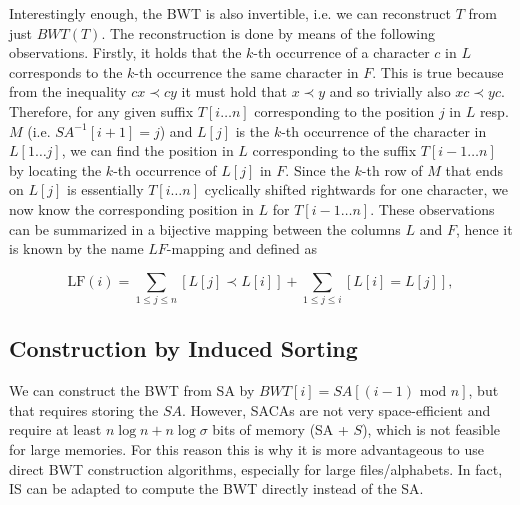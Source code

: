 Interestingly enough, the BWT is also invertible, i.e. we can reconstruct $T$ from just $BWT(T)$. The reconstruction is done by means of the following observations. Firstly, it holds that the $k$-th occurrence of a character $c$ in $L$ corresponds to the $k$-th occurrence the same character in $F$. This is true because from the inequality $cx \prec cy$ it must hold that $x \prec y$ and so trivially also $xc \prec yc$. Therefore, for any given suffix $T[i\ldots n]$ corresponding to the position $j$ in $L$ resp. $M$ (i.e. $SA^{-1}[i+1] = j$) and $L[j]$ is the $k$-th occurrence of the character in $L[1 \ldots j]$, we can find the position in $L$ corresponding to the suffix $T[i-1 \ldots n]$ by locating the $k$-th occurrence of $L[j]$ in $F$. Since the $k$-th row of $M$ that ends on $L[j]$ is essentially $T[i \ldots n]$ cyclically shifted rightwards for one character, we now know the corresponding position in $L$ for $T[i-1 \ldots n]$. These observations can be summarized in a bijective mapping between the columns $L$ and $F$, hence it is known by the name $LF$-mapping and defined as


\begin{equation}
    \text{LF}(i) =  \sum_{1 \leq j \leq n} [L[j] \prec L[i]] + \sum_{1 \leq j \leq i} [L[i] = L[j]],
\end{equation}

\hypertarget{construction-by-induced-sorting}{%
\subsection{Construction by Induced Sorting}\label{construction-by-induced-sorting}}

We can construct the BWT from SA by $BWT[i] = SA[(i-1) \text{ mod } n]$, but that requires storing the $SA$. However, SACAs are not very space-efficient and require at least $n \log n + n \log \sigma$ bits of memory (SA + $S$), which is not feasible for large memories. For this reason this is why it is more advantageous to use direct BWT construction algorithms, especially for large files/alphabets. In fact, IS can be adapted to compute the BWT directly instead of the SA.

